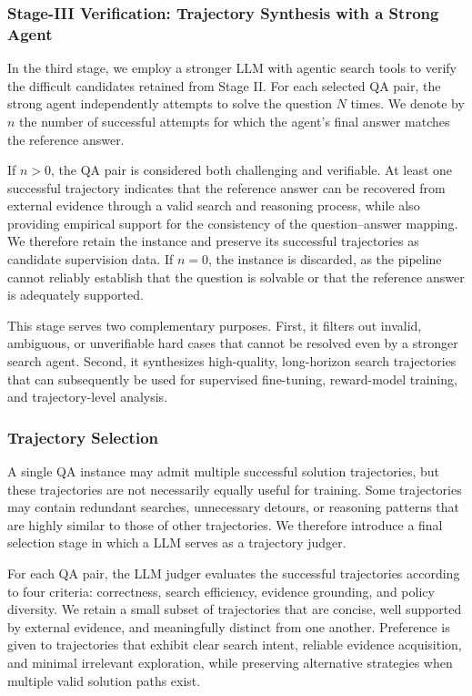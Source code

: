 \documentclass{huawei}
\begin{document}
\subsubsection{Stage-III Verification: Trajectory Synthesis with a Strong Agent}
In the third stage, we employ a stronger LLM with agentic search tools to verify the difficult candidates retained from Stage II. For each selected QA pair, the strong agent independently attempts to solve the question $N$ times. We denote by $n$ the number of successful attempts for which the agent's final answer matches the reference answer.


If $n>0$, the QA pair is considered both challenging and verifiable. At least one successful trajectory indicates that the reference answer can be recovered from external evidence through a valid search and reasoning process, while also providing empirical support for the consistency of the question--answer mapping. We therefore retain the instance and preserve its successful trajectories as candidate supervision data. If $n=0$, the instance is discarded, as the pipeline cannot reliably establish that the question is solvable or that the reference answer is adequately supported.


This stage serves two complementary purposes. First, it filters out invalid, ambiguous, or unverifiable hard cases that cannot be resolved even by a stronger search agent. Second, it synthesizes high-quality, long-horizon search trajectories that can subsequently be used for supervised fine-tuning, reward-model training, and trajectory-level analysis.

\subsubsection{Trajectory Selection}
A single QA instance may admit multiple successful solution trajectories, but these trajectories are not necessarily equally useful for training. Some trajectories may contain redundant searches, unnecessary detours, or reasoning patterns that are highly similar to those of other trajectories. We therefore introduce a final selection stage in which a LLM serves as a trajectory judger.


For each QA pair, the LLM judger evaluates the successful trajectories according to four criteria: correctness, search efficiency, evidence grounding, and policy diversity. We retain a small subset of trajectories that are concise, well supported by external evidence, and meaningfully distinct from one another. Preference is given to trajectories that exhibit clear search intent, reliable evidence acquisition, and minimal irrelevant exploration, while preserving alternative strategies when multiple valid solution paths exist.
\end{document}
